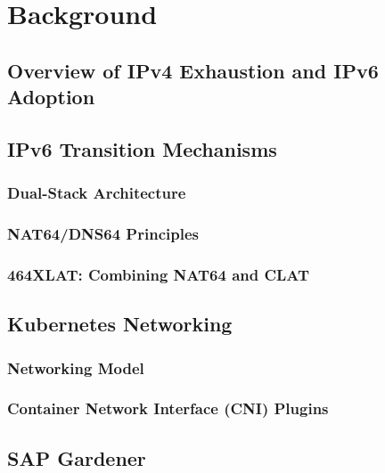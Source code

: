 \chapter{Background}


\section{Overview of IPv4 Exhaustion and IPv6 Adoption}


\section{IPv6 Transition Mechanisms}

\subsection{Dual-Stack Architecture}

\subsection{NAT64/DNS64 Principles}

\subsection{464XLAT: Combining NAT64 and CLAT}


\section{Kubernetes Networking}

\subsection{Networking Model}

\subsection{Container Network Interface (CNI) Plugins}

\section{SAP Gardener}

